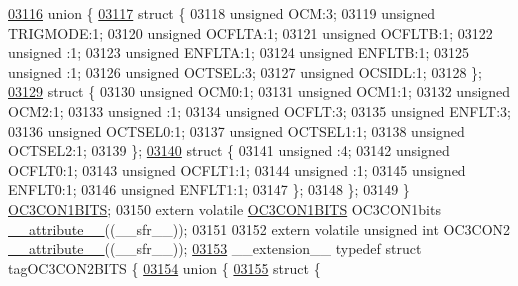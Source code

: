 \begin{DoxyCode}
\hypertarget{a00009_source_l03116}{}\hyperlink{a00009}{03116}   \textcolor{keyword}{union }\{
\hypertarget{a00009_source_l03117}{}\hyperlink{a00009}{03117}     \textcolor{keyword}{struct }\{
03118       \textcolor{keywordtype}{unsigned} OCM:3;
03119       \textcolor{keywordtype}{unsigned} TRIGMODE:1;
03120       \textcolor{keywordtype}{unsigned} OCFLTA:1;
03121       \textcolor{keywordtype}{unsigned} OCFLTB:1;
03122       \textcolor{keywordtype}{unsigned} :1;
03123       \textcolor{keywordtype}{unsigned} ENFLTA:1;
03124       \textcolor{keywordtype}{unsigned} ENFLTB:1;
03125       \textcolor{keywordtype}{unsigned} :1;
03126       \textcolor{keywordtype}{unsigned} OCTSEL:3;
03127       \textcolor{keywordtype}{unsigned} OCSIDL:1;
03128     \};
\hypertarget{a00009_source_l03129}{}\hyperlink{a00009}{03129}     \textcolor{keyword}{struct }\{
03130       \textcolor{keywordtype}{unsigned} OCM0:1;
03131       \textcolor{keywordtype}{unsigned} OCM1:1;
03132       \textcolor{keywordtype}{unsigned} OCM2:1;
03133       \textcolor{keywordtype}{unsigned} :1;
03134       \textcolor{keywordtype}{unsigned} OCFLT:3;
03135       \textcolor{keywordtype}{unsigned} ENFLT:3;
03136       \textcolor{keywordtype}{unsigned} OCTSEL0:1;
03137       \textcolor{keywordtype}{unsigned} OCTSEL1:1;
03138       \textcolor{keywordtype}{unsigned} OCTSEL2:1;
03139     \};
\hypertarget{a00009_source_l03140}{}\hyperlink{a00009}{03140}     \textcolor{keyword}{struct }\{
03141       \textcolor{keywordtype}{unsigned} :4;
03142       \textcolor{keywordtype}{unsigned} OCFLT0:1;
03143       \textcolor{keywordtype}{unsigned} OCFLT1:1;
03144       \textcolor{keywordtype}{unsigned} :1;
03145       \textcolor{keywordtype}{unsigned} ENFLT0:1;
03146       \textcolor{keywordtype}{unsigned} ENFLT1:1;
03147     \};
03148   \};
03149 \} \hyperlink{a00008_de/d85/a00618}{OC3CON1BITS};
03150 \textcolor{keyword}{extern} \textcolor{keyword}{volatile} \hyperlink{a00008_de/d85/a00618}{OC3CON1BITS} OC3CON1bits \hyperlink{a00009_a493c46f03454991ccc5aa7a6e1dfb2a7}{\_\_attribute\_\_}((\_\_sfr\_\_));
03151 
03152 \textcolor{keyword}{extern} \textcolor{keyword}{volatile} \textcolor{keywordtype}{unsigned} \textcolor{keywordtype}{int}  OC3CON2 \hyperlink{a00009_a493c46f03454991ccc5aa7a6e1dfb2a7}{\_\_attribute\_\_}((\_\_sfr\_\_));
\hypertarget{a00009_source_l03153}{}\hyperlink{a00008}{03153} \_\_extension\_\_ \textcolor{keyword}{typedef} \textcolor{keyword}{struct }tagOC3CON2BITS \{
\hypertarget{a00009_source_l03154}{}\hyperlink{a00009}{03154}   \textcolor{keyword}{union }\{
\hypertarget{a00009_source_l03155}{}\hyperlink{a00009}{03155}     \textcolor{keyword}{struct }\{

\end{DoxyCode}

